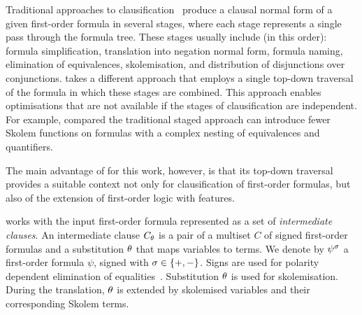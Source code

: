 
%
%

Traditional approaches to clausification~\cite{nonnengart2001computing} produce a clausal normal form of a given first-order formula in several stages, where each stage represents a single pass through the formula tree. These stages usually include (in this order): formula simplification, translation into negation normal form, formula naming, elimination of equivalences, skolemisation, and distribution of disjunctions over conjunctions. \newcnf{} takes a different approach that employs a single top-down traversal of the formula in which these stages are combined. This approach enables optimisations that are not available if the stages of clausification are independent. For example, compared the traditional staged approach \newcnf{} can introduce fewer Skolem functions on formulas with a complex nesting of equivalences and quantifiers. %

The main advantage of \newcnf{} for this work, however, is that its top-down traversal provides a suitable context not only for clausification of first-order formulas, but also of the extension of first-order logic with \folb{} features.

\newcnf{} works with the input first-order formula represented as a set of \emph{intermediate clauses}. An intermediate clause ${C}_{\theta}$ is a pair of a multiset $C$ of signed first-order formulas and a substitution $\theta$ that maps variables to terms. We denote by ${\psi}^{\sigma}$ a first-order formula $\psi$, signed with $\sigma \in \{+,-\}$. Signs are used for polarity dependent elimination of equalities~\cite{nonnengart2001computing}. Substitution $\theta$ is used for skolemisation. During the trans\-la\-tion, $\theta$ is extended by skolemised variables and their corresponding Skolem terms. %

